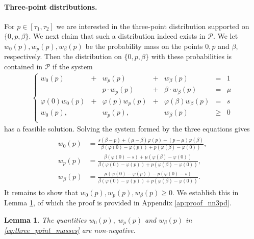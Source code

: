 \documentclass[11pt]{article}
\newtheorem{lemma}{Lemma}[section]
\newcommand{\cP}{\mathcal{P}}
\newcommand{\1}{\mathds{1}}
\begin{document}
\paragraph{Three-point distributions.} 
For $p \in [\tau_1, \tau_2]$ we are interested in the three-point distribution supported on $\{0,p,\beta\}$. We next claim that such a distribution indeed exists in $\cP$. We let $w_0(p), w_p(p), w_{\beta}(p)$ be the probability mass on the points $0,p$ and $\beta$, respectively. Then the distribution on $\{0,p,\beta\}$ with these probabilities is contained in $\cP$ if the system
\begin{align}
    \left\{
\begin{array}{rrrrrrr}
     w_0(p) & + & w_p(p) & + & w_\beta(p) &= & 1 \\
      &  & p\cdot w_p(p) & + & \beta \cdot w_\beta(p) &= & \mu \\
     \varphi(0) w_0(p) & + & \varphi(p)w_p(p) & + & \varphi(\beta)w_\beta(p) & = & s \\
     w_0(p), &  & w_p(p), &   & w_\beta(p) & \geq & 0 \\
\end{array}\right.
\label{eq:equations_threepoint}
\end{align}
has a feasible solution. Solving the system formed by the three equations gives
\begin{align}
\begin{array}{ll}
 w_0(p) & = \displaystyle \frac{s(\beta-p) + (\mu - \beta)\varphi(p) + (p-\mu)\varphi(\beta)}{\beta(\varphi(0) - \varphi(p)) + p(\varphi(\beta) - \varphi(0))},\\[3.5ex] 
        w_p(p) & = \displaystyle  \frac{\beta(\varphi(0)-s) + \mu(\varphi(\beta) - \varphi(0))}{\beta(\varphi(0) - \varphi(p)) + p(\varphi(\beta) - \varphi(0))},  \\[3.5ex] 
        w_\beta(p) & = \displaystyle  \frac{\mu(\varphi(0) - \varphi(p)) - p(\varphi(0)-s)}{\beta(\varphi(0) - \varphi(p)) + p(\varphi(\beta) - \varphi(0))}.
\end{array}
\label{eq:three_point_masses} 
\end{align}
It remains to show that $w_0(p),w_p(p),w_{\beta}(p) \geq 0$. We establish this in Lemma \ref{lem:nn3pd}, of which the proof is provided in Appendix \ref{ap:proof_nn3pd}.

\begin{lemma}\label{lem:nn3pd}
The quantities $w_0(p),\; w_p(p)$ and $w_\beta(p)$  in \eqref{eq:three_point_masses} are non-negative.    
\end{lemma}
\end{document}
